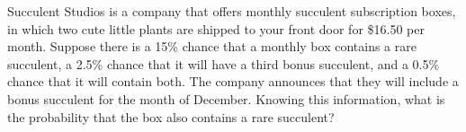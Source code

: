 \documentclass[noanswers]{exam}
\begin{document}
\begin{questions}
	
	\newpage 
	
	\question Succulent Studios is a company that offers monthly succulent subscription boxes, in which two cute little plants are shipped to your front door for \$16.50 per month. Suppose there is a 15\% chance that a monthly box contains a rare succulent, a 2.5\% chance that it will have a third bonus succulent, and a 0.5\% chance that it will contain both. The company announces that they will include a bonus succulent for the month of December. Knowing this information, what is the probability that the box also contains a rare succulent?
	
	\begin{solution}[\stretch{1}]
	

\end{solution}
\end{questions}
\end{document}
